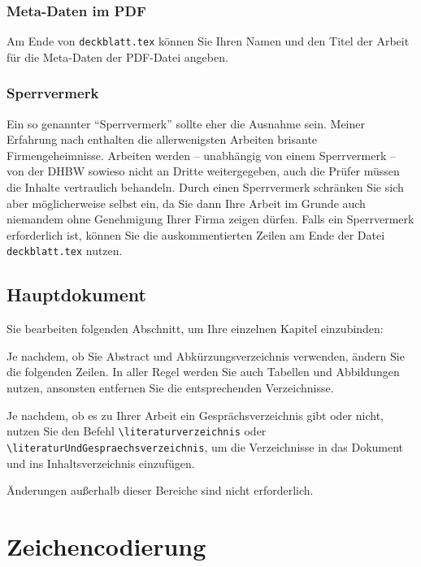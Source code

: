 \subsubsection{Meta-Daten im PDF}
Am Ende von \verb|deckblatt.tex| können Sie Ihren Namen und den Titel der Arbeit für die Meta-Daten der PDF-Datei angeben. 


\subsubsection{Sperrvermerk}
Ein so genannter \enquote{Sperrvermerk} sollte eher die Ausnahme sein. Meiner Erfahrung nach enthalten die allerwenigsten Arbeiten brisante Firmengeheimnisse. Arbeiten werden -- unabhängig von einem Sperrvermerk -- von der DHBW sowieso nicht an Dritte weitergegeben, auch die Prüfer müssen die Inhalte vertraulich behandeln. Durch einen Sperrvermerk schränken Sie sich aber möglicherweise selbst ein, da Sie dann Ihre Arbeit im Grunde auch niemandem ohne Genehmigung Ihrer Firma zeigen dürfen.
Falls ein Sperrvermerk erforderlich ist, können Sie die auskommentierten Zeilen am Ende der Datei \verb|deckblatt.tex| nutzen.

\subsection{Hauptdokument}

Sie bearbeiten folgenden Abschnitt, um Ihre einzelnen Kapitel einzubinden:
\lstset{language=}


Je nachdem, ob Sie Abstract und Abkürzungsverzeichnis verwenden, ändern Sie die folgenden Zeilen.
In aller Regel werden Sie auch Tabellen und Abbildungen nutzen, ansonsten entfernen Sie die entsprechenden Verzeichnisse. 


Je nachdem, ob es zu Ihrer Arbeit ein Gesprächsverzeichnis gibt oder nicht, nutzen Sie den Befehl \verb|\literaturverzeichnis| oder  \verb|\literaturUndGespraechsverzeichnis|, um die Verzeichnisse in das Dokument und ins Inhaltsverzeichnis einzufügen.


Änderungen außerhalb dieser Bereiche sind nicht erforderlich.

\section{Zeichencodierung}\label{section:zeichencodierung}

